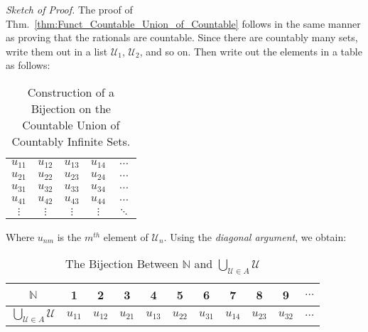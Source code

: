             \textit{Sketch of Proof.} The proof of
            Thm.~\ref{thm:Funct_Countable_Union_of_Countable}
            follows in the same manner
            as proving that the rationals are countable. Since
            there are countably many sets, write them out in
            a list $\mathcal{U}_{1}$, $\mathcal{U}_{2}$, and
            so on. Then write out the elements in a table as
            follows:
            \begin{table}[H]
                \captionsetup{type=table}
                \centering
                \begin{tabular}{ccccc}
                    $u_{11}$&$u_{12}$&$u_{13}$
                    &$u_{14}$&$\hdots$\\
                    $u_{21}$&$u_{22}$&$u_{23}$
                    &$u_{24}$&$\hdots$\\
                    $u_{31}$&$u_{32}$&$u_{33}$
                    &$u_{34}$&$\hdots$\\
                    $u_{41}$&$u_{42}$&$u_{43}$
                    &$u_{44}$&$\hdots$\\
                    $\vdots$&$\vdots$&$\vdots$
                    &$\vdots$&$\ddots$
                \end{tabular}
                \caption{Construction of a Bijection on the
                         Countable Union of Countably Infinite
                         Sets.}
                \label{table:Func_Countable_Union_of_Countable}
            \end{table}
            Where $u_{nm}$ is the $m^{th}$ element of
            $\mathcal{U}_{n}$.
            Using the \textit{diagonal argument},
            we obtain:
            \begin{table}[H]
                \captionsetup{type=table}
                \centering
                \begin{tabular}{|c|c|c|c|c|c|c|c|c|c|c|}
                    \hline
                    $\mathbb{N}$&1&2&3&4&5&6&7&8&9&$\hdots$\\
                    \hline
                    $\bigcup_{\mathcal{U}\in{A}}\mathcal{U}$&
                    $u_{11}$&$u_{12}$&$u_{21}$&$u_{13}$&
                    $u_{22}$&$u_{31}$&$u_{14}$&$u_{23}$&
                    $u_{32}$&$\hdots$\\
                    \hline
                \end{tabular}
                \caption{The Bijection Between $\mathbb{N}$ and
                         $\bigcup_{\mathcal{U}\in{A}}\mathcal{U}$}
                \label{table:Func_Bijection_on_Countable_Union}
            \end{table}
